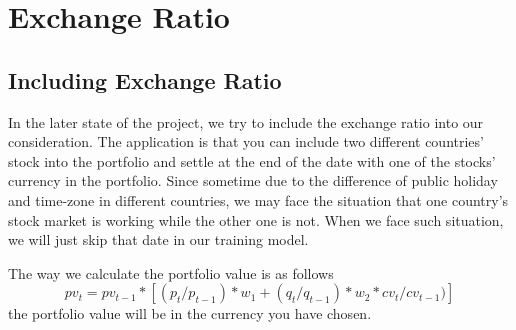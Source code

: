 \chapter{Exchange Ratio}
\label{Exchange}
\section{Including Exchange Ratio}
In the later state of the project, we try to include the exchange ratio into our consideration. The application is that you can include two different countries' stock into the portfolio and settle at the end of the date with one of the stocks' currency in the portfolio. Since sometime due to the difference of public holiday and time-zone in different countries, we may face the situation that one country's stock market is working while the other one is not. When we face such situation, we will just skip that date in our training model.

The way we calculate the portfolio value is as follows
$$ pv_{t} = pv_{t-1} *[ (p_{t} / p_{t-1}) * w_{1}  + (q_{t} / q_{t-1}) * w_{2} * cv_{t}/cv_{t-1})]$$
the portfolio value will be in the currency you have chosen.
\endinput


